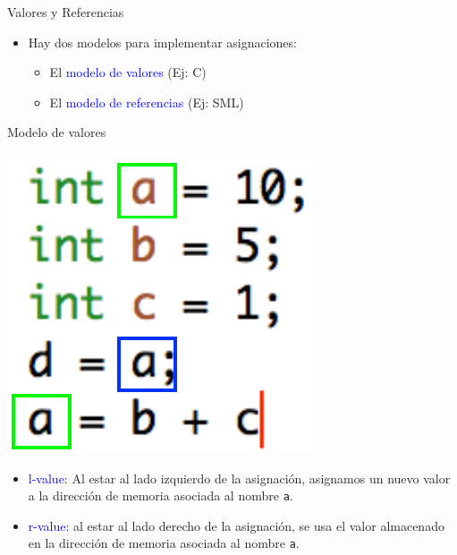 \documentclass[handout]{beamer} %
\newcommand{\blue}[1]{\textcolor{blue}{#1}}
\begin{document}
\begin{frame}{Valores y Referencias}
  \begin{itemize}
    \item Hay dos modelos para implementar asignaciones:
    \begin{itemize}
        \item El \blue{modelo de valores} (Ej: C)
        \item El \blue{modelo de referencias} (Ej: SML)
    \end{itemize}
  \end{itemize}
\end{frame}

\begin{frame}{Modelo de valores}
    \begin{minipage}{0.3\textwidth}
    \includegraphics[width=\textwidth]{./image/cap6/valores-C}
    \end{minipage}
    \begin{minipage}{0.65\textwidth}
     \begin{itemize}
         \item \blue{l-value}: Al estar al lado izquierdo de la asignación, asignamos un nuevo valor a la dirección de memoria asociada al nombre \texttt{a}.
         \item \blue{r-value}: al estar al lado derecho de la asignación, se usa el valor almacenado en la dirección de memoria asociada al nombre \texttt{a}.

\end{itemize}
\end{minipage}
\end{frame}
\end{document}
